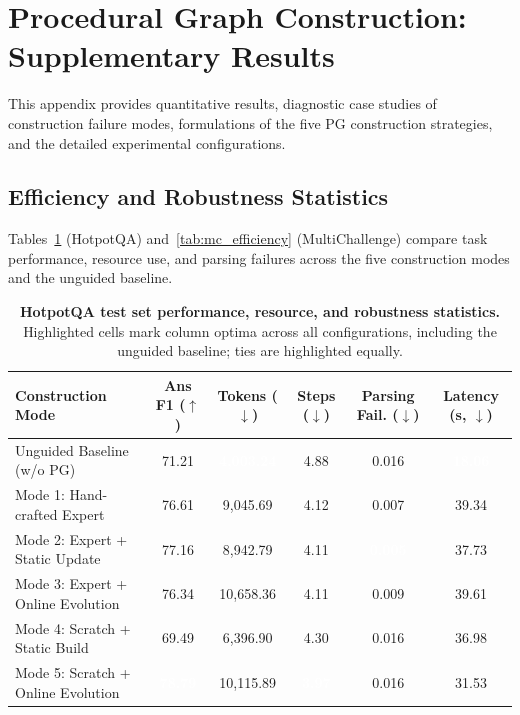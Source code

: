\section{Procedural Graph Construction: Supplementary Results}
\label{app:procedural_graph_construction}
This appendix provides quantitative results, diagnostic case studies of construction failure modes, formulations of the five PG construction strategies, and the detailed experimental configurations.

\subsection{Efficiency and Robustness Statistics}
\label{app:efficiency}
Tables~\ref{tab:hq_efficiency} (HotpotQA) and~\ref{tab:mc_efficiency} (MultiChallenge) compare task performance, resource use, and parsing failures across the five construction modes and the unguided baseline.
\begin{table}[htbp]
\centering
\scriptsize
\setlength{\aboverulesep}{0pt}
\setlength{\belowrulesep}{0pt}
\renewcommand{\arraystretch}{1.2}
\setlength{\tabcolsep}{10.5pt}
\caption{\textbf{HotpotQA test set performance, resource, and robustness statistics.} Highlighted cells mark column optima across all configurations, including the unguided baseline; ties are highlighted equally.}
\label{tab:hq_efficiency}
\begin{tabular}{l c c c c c}
\toprule
\rowcolor{GoogleBlue!15}
\textbf{Construction Mode} & \textbf{Ans F1 ($\uparrow$)} & \textbf{Tokens ($\downarrow$)} & \textbf{Steps ($\downarrow$)} & \textbf{Parsing Fail. ($\downarrow$)} & \textbf{Latency (s, $\downarrow$)} \\
\midrule
Unguided Baseline (w/o PG) & 71.21 & \cellcolor{GoogleBlue}\textcolor{white}{\textbf{4,003.24}} & 4.88 & 0.016 & \cellcolor{GoogleBlue}\textcolor{white}{\textbf{18.06}} \\
Mode 1: Hand-crafted Expert & 76.61 & 9,045.69 & 4.12 & 0.007 & 39.34 \\
Mode 2: Expert + Static Update & 77.16 & 8,942.79 & 4.11 & \cellcolor{GoogleBlue}\textcolor{white}{\textbf{0.005}} & 37.73 \\
Mode 3: Expert + Online Evolution & 76.34 & 10,658.36 & 4.11 & 0.009 & 39.61 \\
Mode 4: Scratch + Static Build & 69.49 & 6,396.90 & 4.30 & 0.016 & 36.98 \\
Mode 5: Scratch + Online Evolution & \cellcolor{GoogleBlue}\textcolor{white}{\textbf{78.79}} & 10,115.89 & \cellcolor{GoogleBlue}\textcolor{white}{\textbf{3.97}} & 0.016 & 31.53 \\
\bottomrule
\end{tabular}
\end{table}

